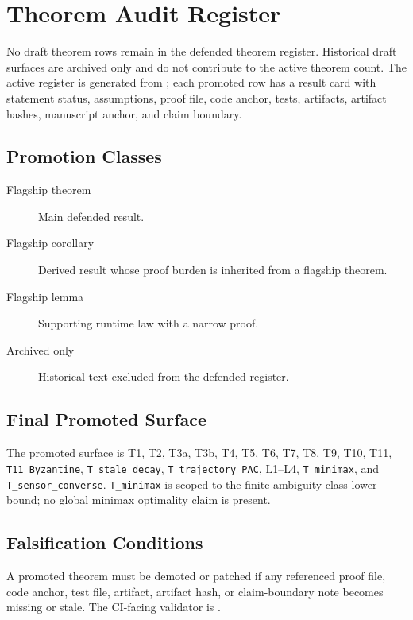 \chapter{Theorem Audit Register}
\label{app:theorem-audit}

No draft theorem rows remain in the defended theorem register.  Historical
draft surfaces are archived only and do not contribute to the active theorem
count.  The active register is generated from
; each promoted row has
a result card with statement status, assumptions, proof file, code anchor,
tests, artifacts, artifact hashes, manuscript anchor, and claim boundary.

\section{Promotion Classes}
\begin{description}
  \item[Flagship theorem] Main defended result.
  \item[Flagship corollary] Derived result whose proof burden is inherited from
    a flagship theorem.
  \item[Flagship lemma] Supporting runtime law with a narrow proof.
  \item[Archived only] Historical text excluded from the defended register.
\end{description}

\section{Final Promoted Surface}
The promoted surface is T1, T2, T3a, T3b, T4, T5, T6, T7, T8, T9, T10, T11,
\texttt{T11\_Byzantine}, \texttt{T\_stale\_decay},
\texttt{T\_trajectory\_PAC}, L1--L4, \texttt{T\_minimax}, and
\texttt{T\_sensor\_converse}.  \texttt{T\_minimax} is scoped to the finite
ambiguity-class lower bound; no global minimax optimality claim is present.

\section{Falsification Conditions}
A promoted theorem must be demoted or patched if any referenced proof file,
code anchor, test file, artifact, artifact hash, or claim-boundary note becomes
missing or stale.  The CI-facing validator is
.
